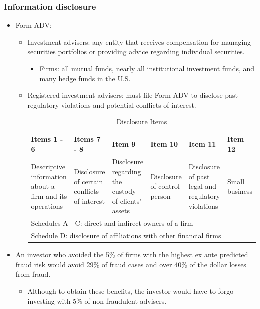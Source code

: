 \subsubsection{Information disclosure}
\begin{itemize}
\item Form ADV:
    \begin{itemize}
    \item Investment advisers: any entity that receives compensation for managing securities portfolios or providing advice regarding individual securities.
        \begin{itemize}
        \item Firms: all mutual funds, nearly all institutional investment funds, and many hedge funds in the U.S.
        \end{itemize}
    \item Registered investment advisers: must file Form ADV to disclose past regulatory violations and potential conflicts of interest.
    


    \begin{table}[h]
        \centering
        \caption{Disclosure Items}
        \begin{tabular}{@{}p{3cm}p{2.5cm}p{2cm}p{2cm}p{2cm}p{2cm}@{}}
            \toprule
            Items 1 - 6 & Items 7 - 8 & Item 9 & Item 10 & Item 11 & Item 12 \\
            \midrule
            Descriptive information about a firm and its operations & Disclosure of certain conflicts of interest & Disclosure regarding the custody of clients’ assets & Disclosure of control person & Disclosure of past legal and regulatory violations & Small business \\
            \midrule
            \multicolumn{6}{l}{Schedules A - C: direct and indirect owners of a firm} \\
            \multicolumn{6}{l}{Schedule D: disclosure of affiliations with other financial firms} \\
            \bottomrule
        \end{tabular}
    \end{table}



    \end{itemize}
\item An investor who avoided the 5\% of firms with the highest ex ante predicted fraud risk would avoid 29\% of fraud cases and over 40\% of the dollar losses from fraud.
    \begin{itemize}
    \item Although to obtain these benefits, the investor would have to forgo investing with 5\% of non-fraudulent advisers.
    \end{itemize}
\end{itemize}


